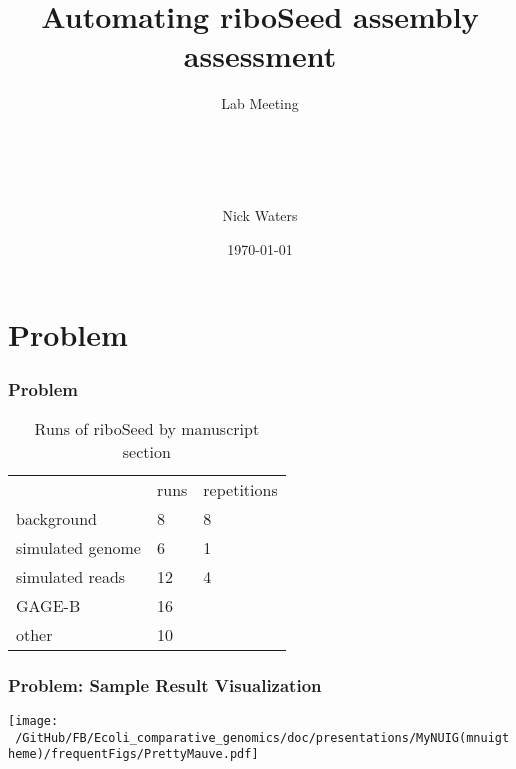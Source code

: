 \documentclass[10pt, compress]{beamer}
\title{Automating riboSeed assembly assessment }
\subtitle{Lab Meeting}
\date{\footnotesize{\today}}
\author{\\ \\ \\ \\\large{Nick Waters}}
\institute{%
  Department of Microbiology\\
School of Natural Sciences\\
National University of Ireland Galway}
\begin{document}
\maketitle



\section{Problem}



\begin{frame}[fragile]
  \frametitle{Problem}
\begin{table}[]
\centering
\caption{Runs of riboSeed by manuscript section}
\label{my-label}
\begin{tabular}{lll}
 & runs & repetitions \\
background & 8 & 8 \\
simulated genome & 6 & 1 \\
simulated reads & 12 & 4 \\
GAGE-B & 16 &  \\
other & 10 &
\end{tabular}
\end{table}
\end{frame}


\begin{frame}[fragile]
  \frametitle{Problem: Sample Result Visualization}
  \centering
  \hspace*{-1.7cm}\texttt{[image: ~/GitHub/FB/Ecoli\_comparative\_genomics/doc/presentations/MyNUIG(mnuigtheme)/frequentFigs/PrettyMauve.pdf]}

\end{frame}
\end{document}
